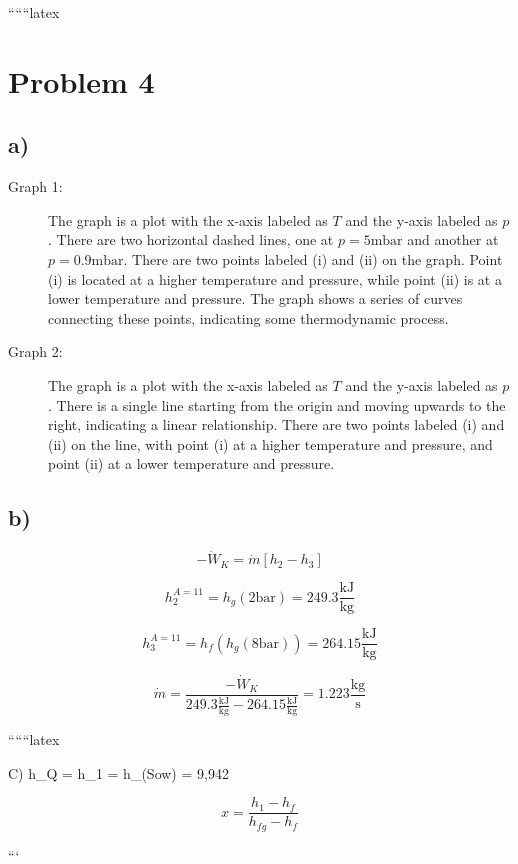 
``````latex


\section*{Problem 4}

\subsection*{a)}

\begin{description}
    \item[Graph 1:] The graph is a plot with the x-axis labeled as $T$ and the y-axis labeled as $p$. There are two horizontal dashed lines, one at $p = 5 \text{mbar}$ and another at $p = 0.9 \text{mbar}$. There are two points labeled (i) and (ii) on the graph. Point (i) is located at a higher temperature and pressure, while point (ii) is at a lower temperature and pressure. The graph shows a series of curves connecting these points, indicating some thermodynamic process.
    \item[Graph 2:] The graph is a plot with the x-axis labeled as $T$ and the y-axis labeled as $p$. There is a single line starting from the origin and moving upwards to the right, indicating a linear relationship. There are two points labeled (i) and (ii) on the line, with point (i) at a higher temperature and pressure, and point (ii) at a lower temperature and pressure.
\end{description}

\subsection*{b)}

\[
-\dot{W}_K = \dot{m} \left[ h_2 - h_3 \right]
\]

\[
h_2^{A=11} = h_g \left( 2 \text{bar} \right) = 249.3 \frac{\text{kJ}}{\text{kg}}
\]

\[
h_3^{A=11} = h_f \left( h_g \left( 8 \text{bar} \right) \right) = 264.15 \frac{\text{kJ}}{\text{kg}}
\]

\[
\dot{m} = \frac{-\dot{W}_K}{249.3 \frac{\text{kJ}}{\text{kg}} - 264.15 \frac{\text{kJ}}{\text{kg}}} = 1.223 \frac{\text{kg}}{\text{s}}
\]

``````latex


C) \quad h_Q = h_1 = h_{(Sow)} = 9,942

\[
x = \frac{h_1 - h_f}{h_{fg} - h_f}
\]

```